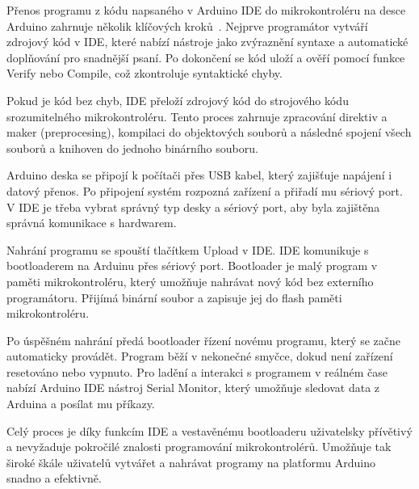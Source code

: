 Přenos programu z kódu napsaného v Arduino IDE do mikrokontroléru na desce Arduino zahrnuje několik klíčových kroků~\cite{wire}.
Nejprve programátor vytváří zdrojový kód v IDE, které nabízí nástroje jako zvýraznění syntaxe a automatické doplňování pro snadnější psaní.
Po dokončení se kód uloží a ověří pomocí funkce Verify nebo Compile, což zkontroluje syntaktické chyby.

Pokud je kód bez chyb, IDE přeloží zdrojový kód do strojového kódu srozumitelného mikrokontroléru.
Tento proces zahrnuje zpracování direktiv a maker (preprocesing), kompilaci do objektových souborů a následné spojení všech souborů a knihoven do jednoho binárního souboru.

Arduino deska se připojí k počítači přes USB kabel, který zajišťuje napájení i datový přenos.
Po připojení systém rozpozná zařízení a přiřadí mu sériový port.
V IDE je třeba vybrat správný typ desky a sériový port, aby byla zajištěna správná komunikace s hardwarem.

Nahrání programu se spouští tlačítkem Upload v IDE. IDE komunikuje s bootloaderem na Arduinu přes sériový port.
Bootloader je malý program v paměti mikrokontroléru, který umožňuje nahrávat nový kód bez externího programátoru.
Přijímá binární soubor a zapisuje jej do flash paměti mikrokontroléru.

Po úspěšném nahrání předá bootloader řízení novému programu, který se začne automaticky provádět.
Program běží v nekonečné smyčce, dokud není zařízení resetováno nebo vypnuto.
Pro ladění a interakci s programem v reálném čase nabízí Arduino IDE nástroj Serial Monitor, který umožňuje sledovat data z Arduina a posílat mu příkazy.

Celý proces je díky funkcím IDE a vestavěnému bootloaderu uživatelsky přívětivý a nevyžaduje pokročilé znalosti programování mikrokontrolérů.
Umožňuje tak široké škále uživatelů vytvářet a nahrávat programy na platformu Arduino snadno a efektivně.



